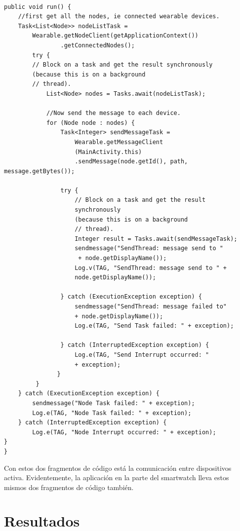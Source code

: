 \documentclass[12pt]{article}
\numberwithin{equation}{section}
\begin{document}
\begin{lstlisting}

public void run() {
	//first get all the nodes, ie connected wearable devices.
    Task<List<Node>> nodeListTask =
    	Wearable.getNodeClient(getApplicationContext())
                .getConnectedNodes();
        try {
        // Block on a task and get the result synchronously 
        (because this is on a background
        // thread).
        	List<Node> nodes = Tasks.await(nodeListTask);

      	    //Now send the message to each device.
            for (Node node : nodes) {
            	Task<Integer> sendMessageTask =
                	Wearable.getMessageClient
                    (MainActivity.this)
                    .sendMessage(node.getId(), path, 			                            					message.getBytes());

                try {
                	// Block on a task and get the result 	
                	synchronously 
                	(because this is on a background
                    // thread).
                    Integer result = Tasks.await(sendMessageTask);
                    sendmessage("SendThread: message send to "
                     + node.getDisplayName());
                    Log.v(TAG, "SendThread: message send to " + 
                    node.getDisplayName());

                } catch (ExecutionException exception) {
                	sendmessage("SendThread: message failed to"
                	+ node.getDisplayName());
                    Log.e(TAG, "Send Task failed: " + exception);

                } catch (InterruptedException exception) {
                    Log.e(TAG, "Send Interrupt occurred: "
                    + exception);
               }
         }
    } catch (ExecutionException exception) {
    	sendmessage("Node Task failed: " + exception);
        Log.e(TAG, "Node Task failed: " + exception);
    } catch (InterruptedException exception) {
        Log.e(TAG, "Node Interrupt occurred: " + exception);
}
}
\end{lstlisting}

Con estos dos fragmentos de código está la comunicación entre dispositivos activa. Evidentemente, la aplicación en la parte del smartwatch lleva estos mismos dos fragmentos de código también.

\newpage
\section{Resultados}
\end{document}
